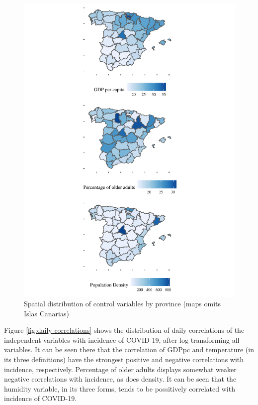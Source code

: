 \documentclass[]{elsarticle} %
\makeatletter
\def\maxwidth{\ifdim\Gin@nat@width>\linewidth\linewidth
\else\Gin@nat@width\fi}
\let\Oldincludegraphics\includegraphics
\renewcommand{\includegraphics}[1]{\Oldincludegraphics[width=\maxwidth]{#1}}
\makeatother
\begin{document}
\begin{figure}
\centering
\includegraphics{Environmental-Correlates-of-COVID19-Spain_files/figure-latex/control-map-1.pdf}
\caption{\label{fig:control-map}Spatial distribution of control
variables by province (maps omits Islas Canarias)}
\end{figure}

Figure \ref{fig:daily-correlations} shows the distribution of daily
correlations of the independent variables with incidence of COVID-19,
after log-transforming all variables. It can be seen there that the
correlation of GDPpc and temperature (in its three definitions) have the
strongest positive and negative correlations with incidence,
respectively. Percentage of older adults displays somewhat weaker
negative correlations with incidence, as does density. It can be seen
that the humidity variable, in its three forms, tends to be possitively
correlated with incidence of COVID-19.
\end{document}

